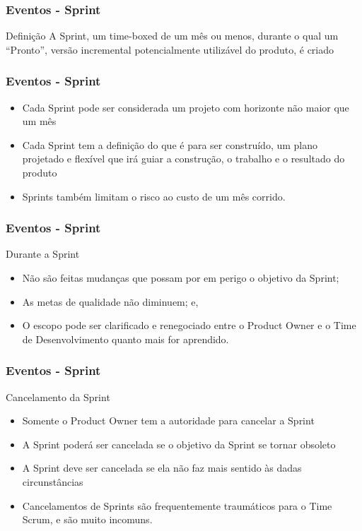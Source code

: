 \begin{frame}
 \frametitle{Eventos - Sprint}
\begin{block}{Definição}
 A Sprint, um time-boxed de um mês ou menos, durante o qual um
“Pronto”, versão incremental potencialmente utilizável do produto, é criado
 \end{block}
\end{frame}

\begin{frame}
 \frametitle{Eventos - Sprint}
 \begin{itemize}
  \item Cada Sprint pode ser considerada um projeto com horizonte não maior que um mês
  \item Cada Sprint tem a definição do que é para
ser construído, um plano projetado e flexível que irá guiar a construção, o trabalho e o
resultado do produto
\item Sprints também limitam o risco ao custo de um
mês corrido.
 \end{itemize}
\end{frame}

\begin{frame}
 \frametitle{Eventos - Sprint}
 Durante a Sprint
 \begin{itemize}
  \item Não são feitas mudanças que possam por em perigo o objetivo da Sprint;
  \item As metas de qualidade não diminuem; e,
  \item O escopo pode ser clarificado e renegociado entre o Product Owner e o Time de
Desenvolvimento quanto mais for aprendido.
 \end{itemize}
\end{frame}

\begin{frame}
 \frametitle{Eventos - Sprint}
Cancelamento da Sprint
 \begin{itemize}
  \item Somente o Product Owner tem a autoridade para cancelar a Sprint
  \item A Sprint poderá ser cancelada se o objetivo da Sprint se tornar obsoleto
  \item A Sprint deve ser cancelada se ela não faz mais sentido às dadas circunstâncias
  \item Cancelamentos de Sprints são
frequentemente traumáticos para o Time Scrum, e são muito incomuns.
 \end{itemize}
\end{frame}

